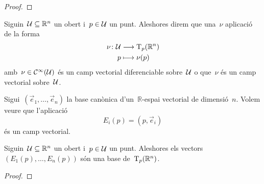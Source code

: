 \documentclass[../../main.tex]{subfiles}
\begin{document}
    \begin{proof}
    \end{proof}
    \begin{definition}
        \label{def:camp vectorial diferenciable}
        Siguin~\(\mathcal{U}\subseteq\mathbb{R}^{n}\) un obert i~\(p\in\mathcal{U}\) un punt.
        Aleshores direm que una~\(\nu\) aplicació de la forma
        \begin{align*}
            \nu\colon\mathcal{U}&\longrightarrow\operatorname{T}_{p}(\mathbb{R}^{n}) \\
            p&\longmapsto\nu(p)
        \end{align*}
        amb~\(\nu\in\mathcal{C}^{\infty}(\mathcal{U})\) és un camp vectorial diferenciable sobre~\(\mathcal{U}\) o que~\(\nu\) és un camp vectorial sobre~\(\mathcal{U}\).
    \end{definition}
    \begin{example}%
        \label{ex:camp vectorial canònic}
        Sigui~\((\vec{e}_{1},\dots,\vec{e}_{n})\) la base canònica d'un~\(\mathbb{R}\)-espai vectorial de dimensió~\(n\).
        Volem veure que l'aplicació
        \[
            E_{i}(p)=(p,\vec{e}_{i})
        \]
        és un camp vectorial.
    \end{example}
    \begin{solution}
    \end{solution}
    \begin{proposition}
        \label{prop:els camps vectorials canònics són una base de l'espai tangent}
        Siguin~\(\mathcal{U}\subseteq\mathbb{R}^{n}\) un obert i~\(p\in\mathcal{U}\) un punt.
        Aleshores els vectors~\((E_{1}(p),\dots,E_{n}(p))\) són una base de~\(\operatorname{T}_{p}(\mathbb{R}^{n})\).
    \end{proposition}
    \begin{proof}
    \end{proof}
\end{document}
